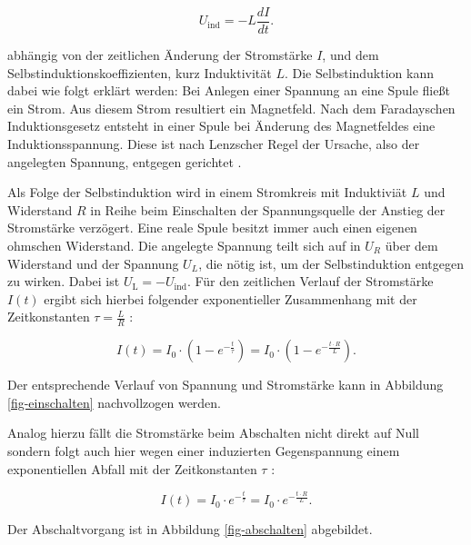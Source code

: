 \documentclass[page,pdftex,12pt,a4paper,twoside,openright]{scrbook}
\begin{document}
\begin{equation}
\label{eq-induktivitaet}
U_\mathrm{ind} = - L \frac{dI}{dt} .
\end{equation}

abhängig von der zeitlichen Änderung der Stromstärke \(I\), und dem Selbstinduktionskoeffizienten, kurz Induktivität \(L\). Die Selbstinduktion kann dabei wie folgt erklärt werden: Bei Anlegen einer Spannung an eine Spule fließt ein Strom. Aus diesem Strom resultiert ein Magnetfeld. Nach dem Faradayschen Induktionsgesetz entsteht in einer Spule bei Änderung des Magnetfeldes eine Induktionsspannung. Diese ist nach Lenzscher Regel der Ursache, also der angelegten Spannung, entgegen gerichtet \cite{demtroder_experimentalphysik_2017}.

Als Folge der Selbstinduktion wird in einem Stromkreis mit Induktiviät \(L\) und Widerstand \(R\) in Reihe beim Einschalten der Spannungsquelle der Anstieg der Stromstärke verzögert. Eine reale Spule besitzt immer auch einen eigenen ohmschen Widerstand. Die angelegte Spannung teilt sich auf in \(U_R\) über dem Widerstand und der Spannung \(U_L\), die nötig ist, um der Selbstinduktion entgegen zu wirken. Dabei ist \(U_{\mathrm{L}} = - U_{\mathrm{ind}}\). Für den zeitlichen Verlauf der Stromstärke \(I(t)\) ergibt sich hierbei folgender exponentieller Zusammenhang mit der Zeitkonstanten \(\tau = \frac{L}{R}\) \cite{raith_elektromagnetismus_2006}:

\begin{equation}
\label{eq-strom-spule}
I(t) = I_{\mathrm{0}} \cdot (1 - e^{ -\frac{t}{\tau}})= I_{\mathrm{0}} \cdot (1- e^{ -\frac{t \cdot R}{L}}).
\end{equation}

Der entsprechende Verlauf von Spannung und Stromstärke kann in Abbildung \ref{fig-einschalten} nachvollzogen werden.

Analog hierzu fällt die Stromstärke beim Abschalten nicht direkt auf Null sondern folgt auch hier wegen einer induzierten Gegenspannung einem exponentiellen Abfall mit der Zeitkonstanten \(\tau\) \cite{raith_elektromagnetismus_2006}:

\begin{equation}
\label{eq-auschalten}
I(t) = I_{\mathrm{0}} \cdot e^{ -\frac{t}{\tau}}= I_{\mathrm{0}} \cdot e^{ -\frac{t \cdot R}{L}}.
\end{equation}

Der Abschaltvorgang ist in Abbildung \ref{fig-abschalten} abgebildet.
\end{document}
